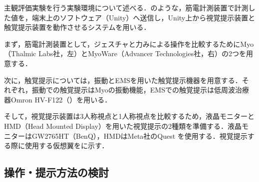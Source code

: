 \begin{small}
    主観評価実験を行う実験環境について述べる．のような，筋電計測装置で計測した値を，端末上のソフトウェア（Unity）へ送信し，Unity上から視覚提示装置と触覚提示装置を動作させるシステムを用いる．



    まず，筋電計測装置として，ジェスチャと力みによる操作を比較するためにMyo（Thalmic Labs社，左）とMyoWare（Advancer Technologies社，右）の2つを用意する．

    次に，触覚提示については，振動とEMSを用いた触覚提示機器を用意する．それぞれ，振動での触覚提示はMyoの振動機能，EMSでの触覚提示は低周波治療器Omron HV-F122（）を用いる．


    そして，視覚提示装置は3人称視点と1人称視点を比較するため，液晶モニターとHMD（Head Mounted Display）を用いた視覚提示の2種類を準備する．液晶モニターはGW2765HT（BenQ），HMDはMeta社のQuest
    を使用する．視覚提示する際に使用する仮想翼をに示す．

  \subsection{操作・提示方法の検討}


\end{small}
